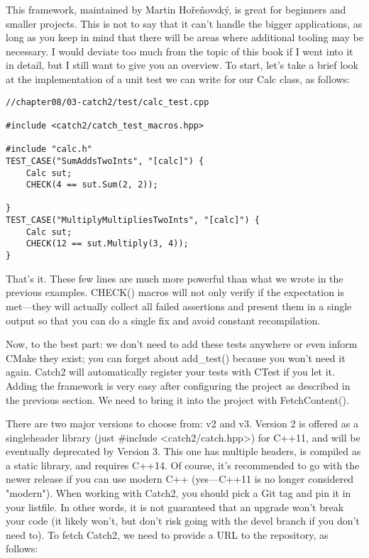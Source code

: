 This framework, maintained by Martin Hořeňovský, is great for beginners and smaller projects. This is not to say that it can't handle the bigger applications, as long as you keep in mind that there will be areas where additional tooling may be necessary. I would deviate too much from the topic of this book if I went into it in detail, but I still want to give you an overview. To start, let's take a brief look at the implementation of a unit test we can write for our Calc class, as follows:

\begin{lstlisting}[style=styleCXX]
//chapter08/03-catch2/test/calc_test.cpp

#include <catch2/catch_test_macros.hpp>

#include "calc.h"
TEST_CASE("SumAddsTwoInts", "[calc]") {
	Calc sut;
	CHECK(4 == sut.Sum(2, 2));

}
TEST_CASE("MultiplyMultipliesTwoInts", "[calc]") {
	Calc sut;
	CHECK(12 == sut.Multiply(3, 4));
}
\end{lstlisting} 

That's it. These few lines are much more powerful than what we wrote in the previous examples. CHECK() macros will not only verify if the expectation is met—they will actually collect all failed assertions and present them in a single output so that you can do a single fix and avoid constant recompilation.

Now, to the best part: we don't need to add these tests anywhere or even inform CMake they exist; you can forget about add\_test() because you won't need it again. Catch2 will automatically register your tests with CTest if you let it. Adding the framework is very easy after configuring the project as described in the previous section. We need to bring it into the project with FetchContent().

There are two major versions to choose from: v2 and v3. Version 2 is offered as a singleheader library (just \#include <catch2/catch.hpp>) for C++11, and will be eventually deprecated by Version 3. This one has multiple headers, is compiled as a static library, and requires C++14. Of course, it's recommended to go with the newer release if you can use modern C++ (yes—C++11 is no longer considered "modern"). When working with Catch2, you should pick a Git tag and pin it in your listfile. In other words, it is not guaranteed that an upgrade won't break your code (it likely won't, but don't risk going with the devel branch if you don't need to). To fetch Catch2, we need to provide a URL to the repository, as follows:

